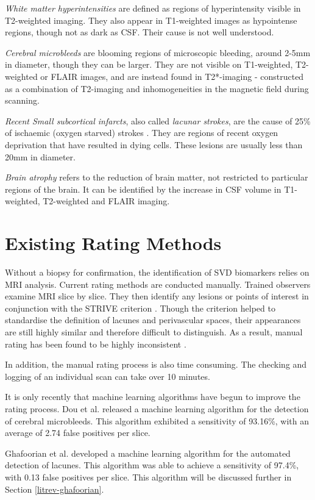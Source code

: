 \textit{White matter hyperintensities} are defined as regions of hyperintensity visible in T2-weighted imaging. They also appear in T1-weighted images as hypointense regions, though not as dark as CSF. Their cause is not well understood.

\textit{Cerebral microbleeds} are blooming regions of microscopic bleeding, around 2-5mm in diameter, though they can be larger. They are not visible on T1-weighted, T2-weighted or FLAIR images, and are instead found in T2*-imaging - constructed as a combination of T2-imaging and inhomogeneities in the magnetic field during scanning. 

\textit{Recent Small subcortical infarcts}, also called \textit{lacunar strokes}, are the cause of 25\% of ischaemic (oxygen starved) strokes \cite{WardlawJ.M.2013Nsfr}. They are regions of recent oxygen deprivation that have resulted in dying cells. These lesions are usually less than 20mm in diameter. 

\textit{Brain atrophy} refers to the reduction of brain matter, not restricted to particular regions of the brain. It can be identified by the increase in CSF volume in T1-weighted, T2-weighted and FLAIR imaging.

\section{Existing Rating Methods}\label{svd-rating}

Without a biopsy for confirmation, the identification of SVD biomarkers relies on MRI analysis. Current rating methods are conducted manually. Trained observers examine MRI slice by slice. They then identify any lesions or points of interest in conjunction with the STRIVE criterion \cite{WardlawJ.M.2013Nsfr}. Though the criterion helped to standardise the definition of lacunes and perivascular spaces, their appearances are still highly similar and therefore difficult to distinguish. As a result, manual rating has been found to be highly inconsistent \cite{PotterGillian2015CPSV}. 

In addition, the manual rating process is also time consuming. The checking and logging of an individual scan can take over 10 minutes.

It is only recently that machine learning algorithms have begun to improve the rating process. Dou et al. \cite{DouQ.2016ADoC} released a machine learning algorithm for the detection of cerebral microbleeds. This algorithm exhibited a sensitivity of 93.16\%, with an average of 2.74 false positives per slice. 

Ghafoorian et al. \cite{GhafoorianM.2017Dml3} developed a machine learning algorithm for the automated detection of lacunes. This algorithm was able to achieve a sensitivity of 97.4\%, with 0.13 false positives per slice. This algorithm will be discussed further in Section \ref{litrev-ghafoorian}.



